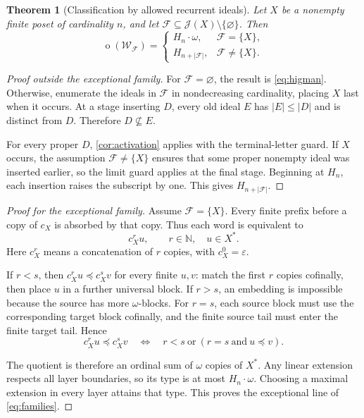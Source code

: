 \documentclass[11pt]{article}
\numberwithin{equation}{section}
\newtheorem{theorem}{Theorem}[section]
\theoremstyle{plain}
\theoremstyle{definition}
\theoremstyle{remark}
\newcommand{\ot}{\operatorname{o}}
\newcommand{\J}{\mathcal J}
\newcommand{\F}{\mathcal F}
\newcommand{\W}{\mathcal W}
\newcommand{\HH}{H}
\newcommand{\N}{\mathbb N}
\newcommand{\emp}{\varepsilon}
\newcommand{\sub}{\preccurlyeq}
\begin{document}
\begin{theorem}[Classification by allowed recurrent ideals]\label{thm:families}
Let $X$ be a nonempty finite poset of cardinality $n$, and let $\F\subseteq\J(X)\setminus\{\varnothing\}$. Then
\begin{equation}\label{eq:families}
 \ot(\W_{\F})=
 \begin{cases}
   \HH_n\cdot\omega,&\F=\{X\},\\
   \HH_{n+|\F|},&\F\neq\{X\}.
 \end{cases}
\end{equation}
\end{theorem}
\begin{proof}[Proof outside the exceptional family]
For $\F=\varnothing$, the result is \eqref{eq:higman}. Otherwise, enumerate the ideals in $\F$ in nondecreasing cardinality, placing $X$ last when it occurs. At a stage inserting $D$, every old ideal $E$ has $|E|\leq|D|$ and is distinct from $D$. Therefore $D\nsubseteq E$.

For every proper $D$, \cref{cor:activation} applies with the terminal-letter guard. If $X$ occurs, the assumption $\F\neq\{X\}$ ensures that some proper nonempty ideal was inserted earlier, so the limit guard applies at the final stage. Beginning at $\HH_n$, each insertion raises the subscript by one. This gives $\HH_{n+|\F|}$.
\end{proof}

\begin{proof}[Proof for the exceptional family]
Assume $\F=\{X\}$. Every finite prefix before a copy of $c_X$ is absorbed by that copy. Thus each word is equivalent to
\begin{equation}\label{eq:universalnormal}
 c_X^r u,\qquad r\in\N,\quad u\in X^*.
\end{equation}
Here $c_X^r$ means a concatenation of $r$ copies, with $c_X^0=\emp$.

If $r<s$, then $c_X^r u\sub c_X^s v$ for every finite $u,v$: match the first $r$ copies cofinally, then place $u$ in a further universal block. If $r>s$, an embedding is impossible because the source has more $\omega$-blocks. For $r=s$, each source block must use the corresponding target block cofinally, and the finite source tail must enter the finite target tail. Hence
\begin{equation}\label{eq:universalorder}
 c_X^r u\sub c_X^s v
 \quad\Longleftrightarrow\quad
 r<s\ \text{or}\ (r=s\ \text{and}\ u\sub v).
\end{equation}

The quotient is therefore an ordinal sum of $\omega$ copies of $X^*$. Any linear extension respects all layer boundaries, so its type is at most $\HH_n\cdot\omega$. Choosing a maximal extension in every layer attains that type. This proves the exceptional line of \eqref{eq:families}.
\end{proof}
\end{document}
